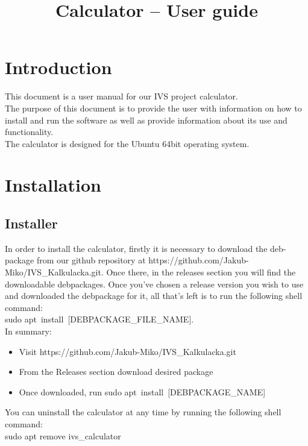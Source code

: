 \documentclass{article}
\title{Calculator -- User guide}
\date{}
\begin{document}
	\maketitle
	
	\tableofcontents
	
	\newpage
	
\section{Introduction}
	This document is a user manual for our IVS project calculator.\\
	The purpose of this document is to provide the user with information on how to install and run the software as well as provide information about its use and functionality.\\
	The calculator is designed for the Ubuntu 64bit operating system.
	\newpage
	
\section{Installation}
	\subsection{Installer}
	In order to install the calculator, firstly it is necessary to download the deb-package from our github repository at https://github.com/Jakub-Miko/IVS\_Kalkulacka.git. Once there, in the releases section you will find the downloadable debpackages. Once you've chosen a release version you wish to use and downloaded the debpackage for it, all that's left is to run the following shell command: \\sudo apt\ install\ [DEBPACKAGE\_FILE\_NAME].\\
	In summary:
 \begin{itemize}
    \item{Visit https://github.com/Jakub-Miko/IVS\_Kalkulacka.git}
	 \item{From the Releases section download desired package}
	 \item{Once downloaded, run sudo apt\ install\ [DEBPACKAGE\_NAME]}
 \end{itemize}
	You can uninstall the calculator at any time by running the following shell command:\\
	sudo apt remove ivs\_calculator
\end{document}
